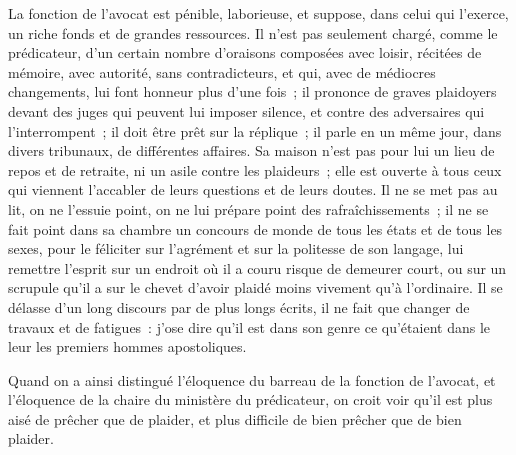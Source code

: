 \documentclass[french,twoside]{book} %
\begin{document}
La fonction de l’avocat est pénible, laborieuse, et suppose, dans celui qui l’exerce, un riche fonds et de grandes ressources. Il n’est pas seulement chargé, comme le prédicateur, d’un certain nombre d’oraisons composées avec loisir, récitées de mémoire, avec autorité, sans contradicteurs, et qui, avec de médiocres changements, lui font honneur plus d’une fois ; il prononce de graves plaidoyers devant des juges qui peuvent lui imposer silence, et contre des adversaires qui l’interrompent ; il doit être prêt sur la réplique ; il parle en un même jour, dans divers tribunaux, de différentes affaires. Sa maison n’est pas pour lui un lieu de repos et de retraite, ni un asile contre les plaideurs ; elle est ouverte à tous ceux qui viennent l’accabler de leurs questions et de leurs doutes. Il ne se met pas au lit, on ne l’essuie point, on ne lui prépare point des rafraîchissements ; il ne se fait point dans sa chambre un concours de monde de tous les états et de tous les sexes, pour le féliciter sur l’agrément et sur la politesse de son langage, lui remettre l’esprit sur un endroit où il a couru risque de demeurer court, ou sur un scrupule qu’il a sur le chevet d’avoir plaidé moins vivement qu’à l’ordinaire. Il se délasse d’un long discours par de plus longs écrits, il ne fait que changer de travaux et de fatigues : j’ose dire qu’il est dans son genre ce qu’étaient dans le leur les premiers hommes apostoliques.\par
Quand on a ainsi distingué l’éloquence du barreau de la fonction de l’avocat, et l’éloquence de la chaire du ministère du prédicateur, on croit voir qu’il est plus aisé de prêcher que de plaider, et plus difficile de bien prêcher que de bien plaider.\par
\bigbreak
\end{document}
